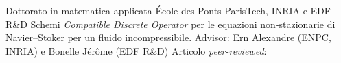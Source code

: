 \documentclass[italian]{RMcv}
\begin{document}
{%





%
%


%
        {Dottorato in matematica applicata}%
        {\'Ecole des Ponts ParisTech, INRIA e EDF R\&D}%
        {\href{\PhDlink}{Schemi \emph{Compatible Discrete Operator} per le equazioni non-stazionarie di Navier--Stoker per un fluido incompressibile}. Advisor: Ern Alexandre (ENPC, INRIA) e Bonelle J\'er\^ome (EDF R\&D)}%
        {Articolo \emph{peer-reviewed}: \articlehref{}}%


}
\end{document}
